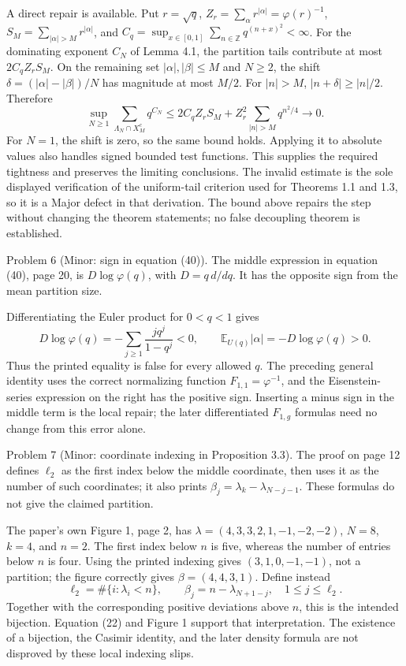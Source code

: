 \documentclass[10pt]{article}
\begin{document}
A direct repair is available. Put \(r=\sqrt q\), \(Z_r=\sum_\alpha r^{|\alpha|}=\varphi(r)^{-1}\), \(S_M=\sum_{|\alpha|>M}r^{|\alpha|}\), and \(C_q=\sup_{x\in[0,1]}\sum_{n\in\mathbb Z}q^{(n+x)^2}<\infty\). For the dominating exponent \(C_N\) of Lemma 4.1, the partition tails contribute at most \(2C_qZ_rS_M\). On the remaining set \(|\alpha|,|\beta|\leq M\) and \(N\geq2\), the shift \(\delta=(|\alpha|-|\beta|)/N\) has magnitude at most \(M/2\). For \(|n|>M\), \(|n+\delta|\geq|n|/2\). Therefore \[\sup_{N\geq1}\sum_{\Lambda_N\cap X_M^c}q^{C_N}
\leq2C_qZ_rS_M+
 Z_r^2\sum_{|n|>M}q^{n^2/4}\longrightarrow0.\] For \(N=1\), the shift is zero, so the same bound holds. Applying it to absolute values also handles signed bounded test functions. This supplies the required tightness and preserves the limiting conclusions. The invalid estimate is the sole displayed verification of the uniform-tail criterion used for Theorems 1.1 and 1.3, so it is a Major defect in that derivation. The bound above repairs the step without changing the theorem statements; no false decoupling theorem is established.\par
Problem 6 (Minor: sign in equation (40)).  The middle expression in equation (40), page 20, is \(D\log\varphi(q)\), with \(D=q\,d/dq\). It has the opposite sign from the mean partition size.\par
Differentiating the Euler product for \(0<q<1\) gives \[D\log\varphi(q)=-\sum_{j\geq1}\frac{jq^j}{1-q^j}<0,
\qquad
\mathbb E_{U(q)}|\alpha|=-D\log\varphi(q)>0.\] Thus the printed equality is false for every allowed \(q\). The preceding general identity uses the correct normalizing function \(F_{1,1}=\varphi^{-1}\), and the Eisenstein-series expression on the right has the positive sign. Inserting a minus sign in the middle term is the local repair; the later differentiated \(F_{1,g}\) formulas need no change from this error alone.\par
Problem 7 (Minor: coordinate indexing in Proposition 3.3).  The proof on page 12 defines \(\ell_2\) as the first index below the middle coordinate, then uses it as the number of such coordinates; it also prints \(\beta_j=\lambda_k-\lambda_{N-j-1}\). These formulas do not give the claimed partition.\par
The paper’s own Figure 1, page 2, has \(\lambda=(4,3,3,2,1,-1,-2,-2)\), \(N=8\), \(k=4\), and \(n=2\). The first index below \(n\) is five, whereas the number of entries below \(n\) is four. Using the printed indexing gives \((3,1,0,-1,-1)\), not a partition; the figure correctly gives \(\beta=(4,4,3,1)\). Define instead \[\ell_2=\#\{i:\lambda_i<n\},\qquad
\beta_j=n-\lambda_{N+1-j},\quad 1\leq j\leq\ell_2.\] Together with the corresponding positive deviations above \(n\), this is the intended bijection. Equation (22) and Figure 1 support that interpretation. The existence of a bijection, the Casimir identity, and the later density formula are not disproved by these local indexing slips.\par
\end{document}
